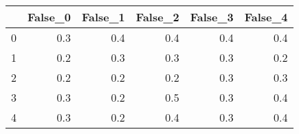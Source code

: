 \begin{tabular}{lrrrrr}
\toprule
{} &  False\_0 &  False\_1 &  False\_2 &  False\_3 &  False\_4 \\ \hline
\midrule
0 &      0.3 &      0.4 &      0.4 &      0.4 &      0.4 \\ \hline
1 &      0.2 &      0.3 &      0.3 &      0.3 &      0.2 \\ \hline
2 &      0.2 &      0.2 &      0.2 &      0.3 &      0.3 \\ \hline
3 &      0.3 &      0.2 &      0.5 &      0.3 &      0.4 \\ \hline
4 &      0.3 &      0.2 &      0.4 &      0.3 &      0.4 \\ \hline
\bottomrule
\end{tabular}
